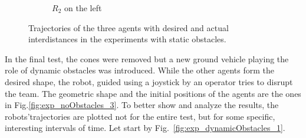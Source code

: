 \documentclass{ifacconf}
\begin{document}
\begin{figure}
\begin{subfigure}[b]{0.31\columnwidth}
        \caption{$R_2$ on the left}
        \label{fig:exp_staticObstacles_left}
    \end{subfigure}
    \vspace{-0.2cm}
    \caption{Trajectories of the three agents with desired and actual interdistances 
   in the experiments with static obstacles.}
    \label{fig:exp_staticObstacles}
\end{figure}

In the final test, the cones were removed but 
a new ground vehicle playing the role of dynamic obstacles was introduced.
While the other agents form the desired shape, the robot, guided using  
a joystick by an operator tries to disrupt the team.
The geometric shape and the initial positions of 
the agents are the ones in Fig.\ref{fig:exp_noObstacles_3}.
To better show and analyze the results, the robots'trajectories are plotted 
not for the entire test, but for some specific, interesting intervals of time.
Let start by Fig.~\ref{fig:exp_dynamicObstacles_1}.
\end{document}
